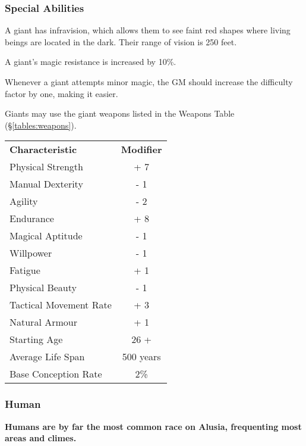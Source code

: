 \begin{multicols*}{3}
\subsubsection{Special Abilities}

\begin{Enumerate}
\item
A giant has infravision, which allows them to see faint red shapes
where living beings are located in the dark. Their range of vision is
250 feet.

\item
A giant's magic resistance is increased by 10\%.

\item
Whenever a giant attempts minor magic, the GM should increase the
difficulty factor by one, making it easier.

\item
Giants may use the giant weapons listed in the Weapons Table
(\S\ref{tables:weapons}).
\end{Enumerate}

\begin{tabularx}{\linewidth}{Xc}
\textbf{Characteristic} & \textbf{Modifier} \\
Physical Strength	& + 7 \\
Manual Dexterity	& - 1 \\
Agility			& - 2 \\
Endurance		& + 8 \\
Magical Aptitude	& - 1 \\
Willpower		& - 1 \\
Fatigue			& + 1 \\
Physical Beauty		& - 1 \\
Tactical Movement Rate	& + 3 \\
Natural Armour		& + 1 \\
Starting Age		& 26 + \\
Average Life Span	& 500 years \\
Base Conception Rate	& 2\% \\
\end{tabularx}

\subsubsection{Human}

\textbf{Humans are by far the most common race on Alusia, frequenting
most areas and climes.}


\end{multicols*}
